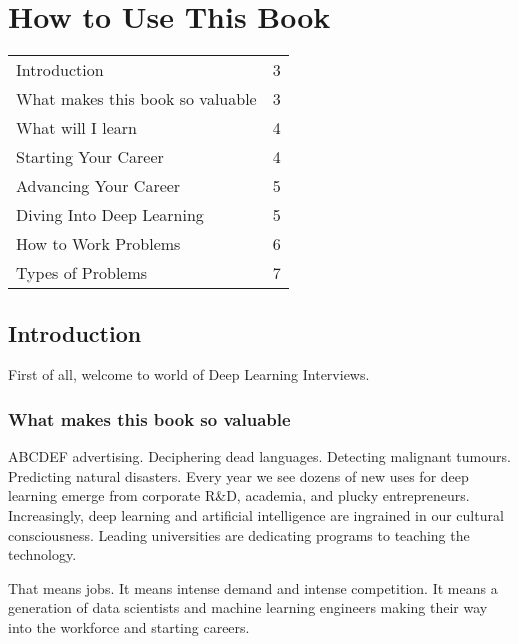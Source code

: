 \documentclass{book}
\begin{document}
\chapter{How to Use This Book}

\vspace{-1em}

\vspace{0.5em}
\noindent\begin{tabular}{@{}L{0.9\textwidth}@{\dotfill}R{0.05\textwidth}@{}}
Introduction & 3 \\
What makes this book so valuable & 3 \\
What will I learn & 4 \\
\hspace{0.5cm}Starting Your Career & 4 \\
\hspace{0.5cm}Advancing Your Career & 5 \\
\hspace{0.5cm}Diving Into Deep Learning & 5 \\
How to Work Problems & 6 \\
Types of Problems & 7 \\
\end{tabular}

\vspace{1em}
\section{Introduction}
First of all, welcome to world of Deep Learning Interviews.

\subsection{What makes this book so valuable}
ABCDEF advertising. Deciphering dead languages. Detecting malignant tumours. Predicting natural disasters. Every year we see dozens of new uses for deep learning emerge from corporate R\&D, academia, and plucky entrepreneurs. Increasingly, deep learning and artificial intelligence are ingrained in our cultural consciousness. Leading universities are dedicating programs to teaching the technology.

That means jobs. It means intense demand and intense competition. It means a generation of data scientists and machine learning engineers making their way into the workforce and starting careers.
\end{document}
